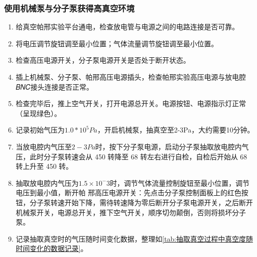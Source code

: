 \documentclass[dvipsnames, svgnames,a4paper,11pt]{article}
\begin{document}
	\subsubsection{使用机械泵与分子泵获得高真空环境}
	\begin{enumerate}
		\item 给真空帕邢实验平台通电，检查放电管与电源之间的电路连接是否可靠。
		\item 将电压调节旋钮调至最小位置；气体流量调节旋钮调至最小位置。
		\item 检查高压电源开关，分子泵电源开关是否处于断开状态。
		\item 插上机械泵、分子泵、帕邢高压电源插头，检查帕邢实验高压电源与放电腔𝐵𝑁𝐶接头连接是否正常。 
		\item 检查完毕后，推上空气开关，打开电源总开关。电源按钮、电源指示灯正常（呈现绿色）。 
		\item 记录初始气压为$1.0*10^5Pa$，开启机械泵，抽真空至2-3Pa，大约需要10分钟。
		\item 当放电腔内气压至$2-3Pa$时，按下分子泵电源，启动分子泵抽取放电腔内气压，此时分子泵转速会从 450 转降至 68 转左右进行自检，自检后开始从 68 转上升至 450 转。
		\item 抽取放电腔内气压为$1.5\times10^-3$时，调节气体流量控制旋钮至最小位置，调节电压到最小值，断开帕
		邢高压电源开关：先点击分子泵控制面板上的红色按钮，分子泵转速开始下降，需待转速降为零后断开分子泵电源开关，之后断开机械泵开关，电源总开关，推下空气开关，顺序切勿颠倒，否则将损坏分子泵。
		\item 记录抽取真空时的气压随时间变化数据，整理如\cref{tab:抽取真空过程中真空度随时间变化的数据记录}。
	\end{enumerate}
\end{document}

